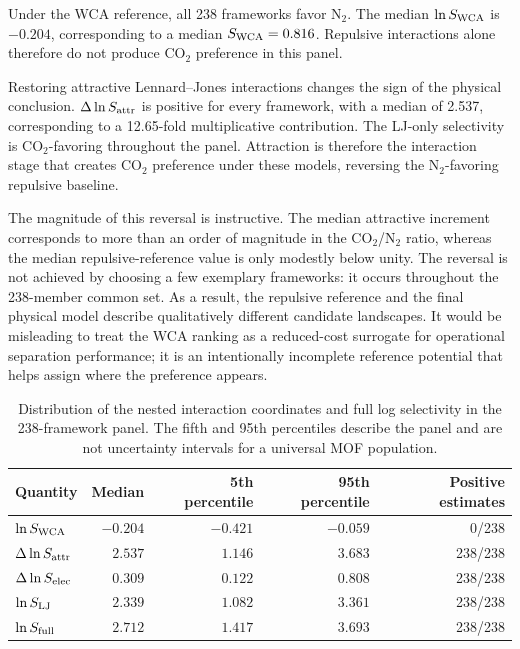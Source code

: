 \documentclass[journal=jctcce,manuscript=article]{achemso}
\begin{document}
Under the WCA reference, all 238 frameworks favor N$_2$. The median $\ln S_{\rm WCA}$ is $-0.204$, corresponding to a median $S_{\rm WCA}=0.816$. Repulsive interactions alone therefore do not produce CO$_2$ preference in this panel.

Restoring attractive Lennard--Jones interactions changes the sign of the physical conclusion. $\Delta\ln S_{\rm attr}$ is positive for every framework, with a median of 2.537, corresponding to a 12.65-fold multiplicative contribution. The LJ-only selectivity is CO$_2$-favoring throughout the panel. Attraction is therefore the interaction stage that creates CO$_2$ preference under these models, reversing the N$_2$-favoring repulsive baseline.

The magnitude of this reversal is instructive. The median attractive increment corresponds to more than an order of magnitude in the CO$_2$/N$_2$ ratio, whereas the median repulsive-reference value is only modestly below unity. The reversal is not achieved by choosing a few exemplary frameworks: it occurs throughout the 238-member common set. As a result, the repulsive reference and the final physical model describe qualitatively different candidate landscapes. It would be misleading to treat the WCA ranking as a reduced-cost surrogate for operational separation performance; it is an intentionally incomplete reference potential that helps assign where the preference appears.

\begin{table}[tbp]
\centering
\caption{Distribution of the nested interaction coordinates and full log selectivity in the 238-framework panel. The fifth and 95th percentiles describe the panel and are not uncertainty intervals for a universal MOF population.}
\label{tab:coordinate_summary}
\small
\begin{tabular}{lrrrr}
\toprule
Quantity & Median & 5th percentile & 95th percentile & Positive estimates\\
\midrule
$\ln S_{\rm WCA}$ & $-0.204$ & $-0.421$ & $-0.059$ & 0/238\\
$\Delta\ln S_{\rm attr}$ & $2.537$ & $1.146$ & $3.683$ & 238/238\\
$\Delta\ln S_{\rm elec}$ & $0.309$ & $0.122$ & $0.808$ & 238/238\\
$\ln S_{\rm LJ}$ & $2.339$ & $1.082$ & $3.361$ & 238/238\\
$\ln S_{\rm full}$ & $2.712$ & $1.417$ & $3.693$ & 238/238\\
\bottomrule
\end{tabular}
\end{table}
\end{document}
